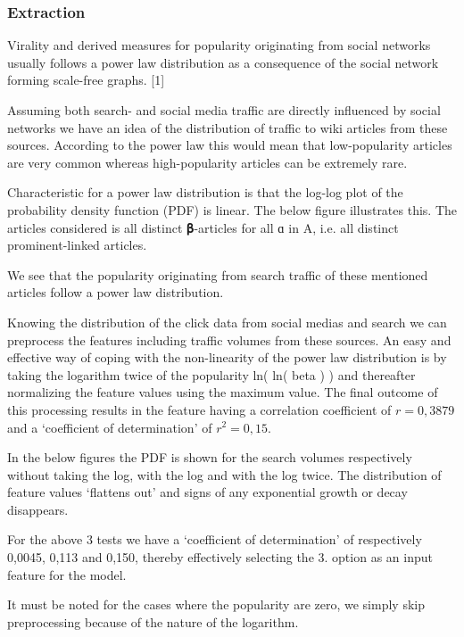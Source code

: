 \subsubsection{Extraction}
Virality and derived measures for popularity originating from social networks usually follows a power law distribution as a consequence of the social network forming scale-free graphs. [1]

Assuming both search- and social media traffic are directly influenced by social networks we have an idea of the distribution of traffic to wiki articles from these sources. According to the power law this would mean that low-popularity articles are very common whereas high-popularity articles can be extremely rare.

Characteristic for a power law distribution is that the log-log plot of the probability density function (PDF) is linear. The below figure illustrates this. The articles considered is all distinct 𝛃-articles for all ɑ in A, i.e. all distinct prominent-linked articles.

We see that the popularity originating from search traffic of these mentioned articles follow a power law distribution.

Knowing the distribution of the click data from social medias and search we can preprocess the features including traffic volumes from these sources. An easy and effective way of coping with the non-linearity of the power law distribution is by taking the logarithm twice of the popularity ln( ln( beta ) ) and thereafter normalizing the feature values using the maximum value.
The final outcome of this processing results in the feature having a correlation coefficient of $r = 0,3879$ and a `coefficient of determination' of $r^2 = 0,15$.  

In the below figures the PDF is shown for the search volumes respectively without taking the log, with the log and with the log twice. The distribution of feature values `flattens out' and signs of any exponential growth or decay disappears.

For the above 3 tests we have a `coefficient of determination' of respectively 0,0045, 0,113 and 0,150, thereby effectively selecting the 3. option as an input feature for the model.

It must be noted for the cases where the popularity are zero, we simply skip preprocessing because of the nature of the logarithm.






